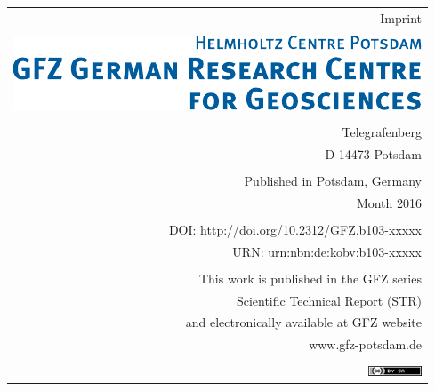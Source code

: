 {{		%
		\begin{flushright}\vfill
			\begin{tabular}{r}
				{\normalsize Imprint} \\
				\\
				\includegraphics{gfzlogo_ur.pdf} \\
				\\
				Telegrafenberg \\
				D-14473 Potsdam  \\ 
				\\
				Published in Potsdam, Germany \\
				Month 2016 \\
				\rstIssn \\
				DOI: http://doi.org/10.2312/GFZ.b103-xxxxx \\
				URN: urn:nbn:de:kobv:b103-xxxxx \\
				\\
				This work is published in the GFZ series \\
				Scientific Technical Report (STR) \\
				and electronically available at GFZ website \\
				www.gfz-potsdam.de \\
				\\
				\href{http://creativecommons.org/licenses/by-sa/4.0/}{\includegraphics{creative_common1.png}}
			\end{tabular}
		\end{flushright}
	}
	\thispagestyle{empty}
	\clearpage

	\thispagestyle{empty}
	\clearpage
}
\makeatother